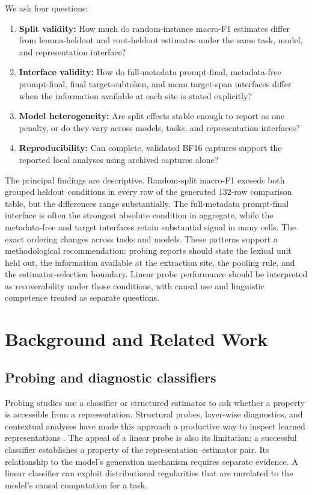 \documentclass[pdflatex,sn-basic]{sn-jnl}
\begin{document}
We ask four questions:

\begin{enumerate}
    \item \textbf{Split validity:} How much do random-instance macro-F1
    estimates differ from lemma-heldout and root-heldout estimates under the
    same task, model, and representation interface?
    \item \textbf{Interface validity:} How do full-metadata prompt-final,
    metadata-free prompt-final, final target-subtoken, and mean target-span
    interfaces differ when the information available at each site is stated
    explicitly?
    \item \textbf{Model heterogeneity:} Are split effects stable enough to
    report as one penalty, or do they vary across models, tasks, and
    representation interfaces?
    \item \textbf{Reproducibility:} Can complete, validated BF16 captures
    support the reported local analyses using archived captures alone?
\end{enumerate}

The principal findings are descriptive. Random-split macro-F1 exceeds both
grouped heldout conditions in every row of the generated 132-row comparison
table, but the differences range substantially. The full-metadata prompt-final
interface is often the strongest absolute condition in aggregate, while the
metadata-free and target interfaces retain substantial signal in many cells.
The exact ordering changes across tasks and models. These patterns support a
methodological recommendation: probing reports should state the lexical unit
held out, the information available at the extraction site, the pooling rule,
and the estimator-selection boundary. Linear probe performance should be
interpreted as recoverability under those conditions, with causal use and
linguistic competence treated as separate questions.

\section{Background and Related Work}

\subsection{Probing and diagnostic classifiers}

Probing studies use a classifier or structured estimator to ask whether a
property is accessible from a representation. Structural probes, layer-wise
diagnostics, and contextual analyses have made this approach a productive way
to inspect learned representations \citep{hewitt-manning-2019,
tenney-das-pavlick-2019,tenney-etal-2019-iclr}. The appeal of a linear probe is
also its limitation: a successful classifier establishes a property of the
representation--estimator pair. Its relationship to the model's generation
mechanism requires separate evidence. A linear classifier can exploit distributional
regularities that are unrelated to the model's causal computation for a task.
\end{document}

